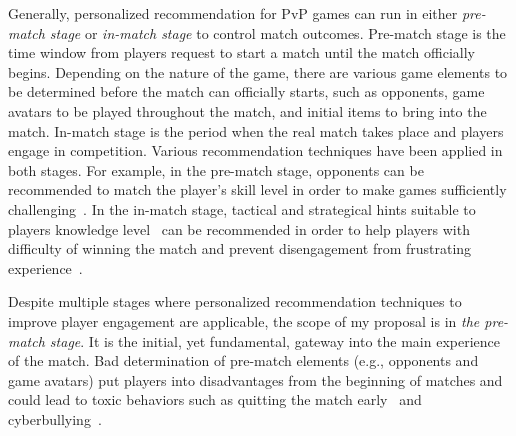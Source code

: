 Generally, personalized recommendation for PvP games can run in either \textit{pre-match stage} or \textit{in-match stage} to control match outcomes. Pre-match stage is the time window from players request to start a match until the match officially begins. Depending on the nature of the game, there are various game elements to be determined before the match can officially starts, such as opponents, game avatars to be played throughout the match, and initial items to bring into the match. In-match stage is the period when the real match takes place and players engage in competition. Various recommendation techniques have been applied in both stages. For example, in the pre-match stage, opponents can be recommended to match the player's skill level in order to make games sufficiently challenging~\cite{sweetser2005gameflow,flow1990psychology,chen2007flow}. In the in-match stage, tactical and strategical hints suitable to players knowledge level~\cite{weber2009data,cunha2014rtsmate} can be recommended in order to help players with difficulty of winning the match and prevent disengagement from frustrating experience~\cite{schoenau2011player}.



Despite multiple stages where personalized recommendation techniques to improve player engagement are applicable, the scope of my proposal is in \textit{the pre-match stage}. It is the initial, yet fundamental, gateway into the main experience of the match. Bad determination of pre-match elements (e.g., opponents and game avatars) put players into disadvantages from the beginning of matches and could lead to toxic behaviors such as quitting the match early~\cite{shores2014identification} and cyberbullying~\cite{kwak2015exploring}. 




